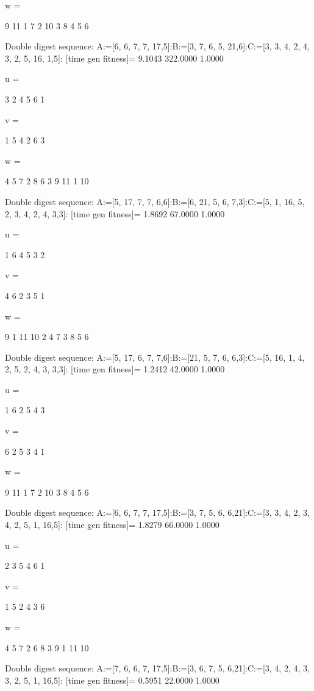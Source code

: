 w =

     9    11     1     7     2    10     3     8     4     5     6

Double digest sequence:
A:=[6, 6, 7, 7, 17,5]:B:=[3, 7, 6, 5, 21,6]:C:=[3, 3, 4, 2, 4, 3, 2, 5, 16, 1,5]:
[time gen fitness]=
    9.1043  322.0000    1.0000


u =

     3     2     4     5     6     1


v =

     1     5     4     2     6     3


w =

     4     5     7     2     8     6     3     9    11     1    10

Double digest sequence:
A:=[5, 17, 7, 7, 6,6]:B:=[6, 21, 5, 6, 7,3]:C:=[5, 1, 16, 5, 2, 3, 4, 2, 4, 3,3]:
[time gen fitness]=
    1.8692   67.0000    1.0000


u =

     1     6     4     5     3     2


v =

     4     6     2     3     5     1


w =

     9     1    11    10     2     4     7     3     8     5     6

Double digest sequence:
A:=[5, 17, 6, 7, 7,6]:B:=[21, 5, 7, 6, 6,3]:C:=[5, 16, 1, 4, 2, 5, 2, 4, 3, 3,3]:
[time gen fitness]=
    1.2412   42.0000    1.0000


u =

     1     6     2     5     4     3


v =

     6     2     5     3     4     1


w =

     9    11     1     7     2    10     3     8     4     5     6

Double digest sequence:
A:=[6, 6, 7, 7, 17,5]:B:=[3, 7, 5, 6, 6,21]:C:=[3, 3, 4, 2, 3, 4, 2, 5, 1, 16,5]:
[time gen fitness]=
    1.8279   66.0000    1.0000


u =

     2     3     5     4     6     1


v =

     1     5     2     4     3     6


w =

     4     5     7     2     6     8     3     9     1    11    10

Double digest sequence:
A:=[7, 6, 6, 7, 17,5]:B:=[3, 6, 7, 5, 6,21]:C:=[3, 4, 2, 4, 3, 3, 2, 5, 1, 16,5]:
[time gen fitness]=
    0.5951   22.0000    1.0000



